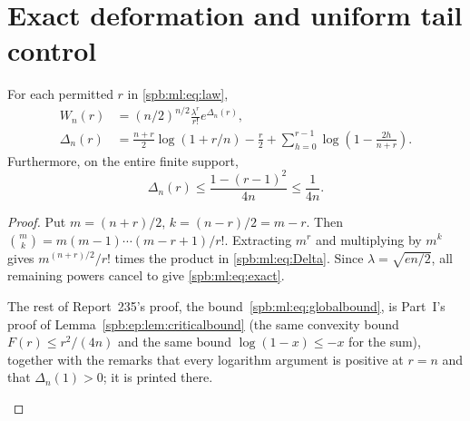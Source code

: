 \section{Exact deformation and uniform tail control}\label{spb:ml:sec:exact}
\begin{lemma}\label{spb:ml:lem:exact}
For each permitted $r$ in \eqref{spb:ml:eq:law},
\begin{align}
W_n(r)&=(n/2)^{n/2}\frac{\lambda^r}{r!}e^{\Delta_n(r)},\label{spb:ml:eq:exact}\\
\Delta_n(r)&=\frac{n+r}{2}\log(1+r/n)-\frac r2
 +\sum_{h=0}^{r-1}\log\left(1-\frac{2h}{n+r}\right).\label{spb:ml:eq:Delta}
\end{align}
Furthermore, on the entire finite support,
\begin{equation}\label{spb:ml:eq:globalbound}
 \Delta_n(r)\le\frac{1-(r-1)^2}{4n}\le\frac1{4n}.
\end{equation}
\end{lemma}
\begin{proof}
Put $m=(n+r)/2$, $k=(n-r)/2=m-r$. Then
$\binom mk=m(m-1)\cdots(m-r+1)/r!$. Extracting $m^r$ and multiplying by $m^k$ gives $m^{(n+r)/2}/r!$ times the product in \eqref{spb:ml:eq:Delta}. Since $\lambda=\sqrt{en/2}$, all remaining powers cancel to give \eqref{spb:ml:eq:exact}.

\begin{writenote}
The rest of Report~235's proof, the bound~\eqref{spb:ml:eq:globalbound}, is
Part~I's proof of Lemma~\ref{spb:ep:lem:criticalbound} (the same convexity
bound $F(r)\le r^2/(4n)$ and the same bound $\log(1-x)\le-x$ for the sum),
together with the remarks that every logarithm argument is positive at $r=n$
and that $\Delta_n(1)>0$; it is printed there.
\end{writenote}
\end{proof}

